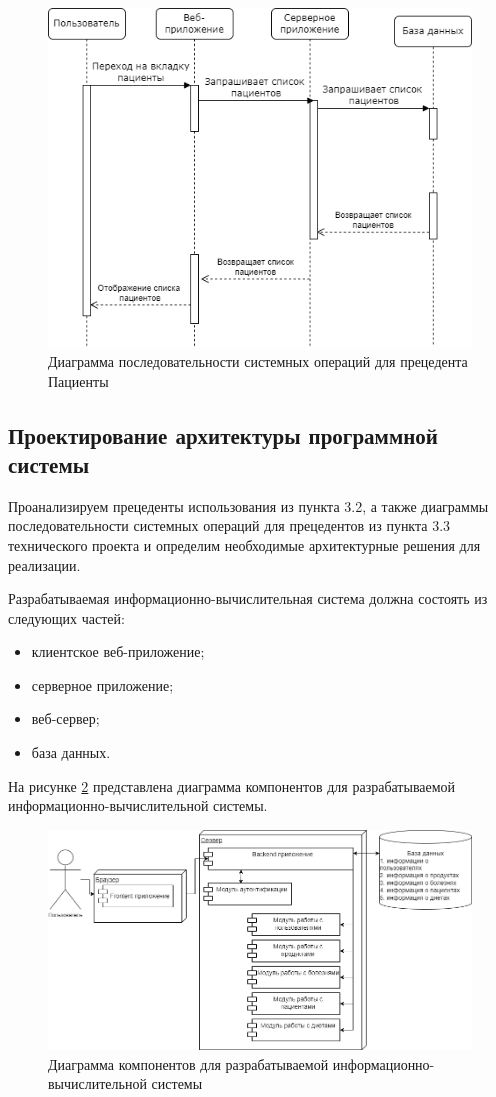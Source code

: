 \begin{figure}[H]
	\centering
	\includegraphics[width=0.7\linewidth]{"images/Диаграмма последовательности системных операций для прецедента Пациенты.drawio"}
	\caption{Диаграмма последовательности системных операций для прецедента Пациенты}
	\label{fig:diagrammPatient}
\end{figure}

\subsection{Проектирование архитектуры программной системы}

Проанализируем прецеденты использования из пункта 3.2, а также диаграммы последовательности системных операций для прецедентов из пункта 3.3 технического проекта и определим необходимые архитектурные решения для реализации.

Разрабатываемая информационно-вычислительная система должна состоять из следующих частей:

\begin{itemize} 
	\item клиентское веб-приложение;
	\item серверное приложение;
	\item веб-сервер;
	\item база данных.
\end{itemize}

На рисунке \ref{fig:diagrammaarhitect} представлена диаграмма компонентов для разрабатываемой информационно-вычислительной системы.

\begin{figure}[H]
	\centering
	\includegraphics[width=0.7\linewidth]{"images/Диаграмма компонентов для разрабатываемой информационно-вычислительной системы.drawio"}
	\caption{Диаграмма компонентов для разрабатываемой информационно-вычислительной системы}
	\label{fig:diagrammaarhitect}
\end{figure}

